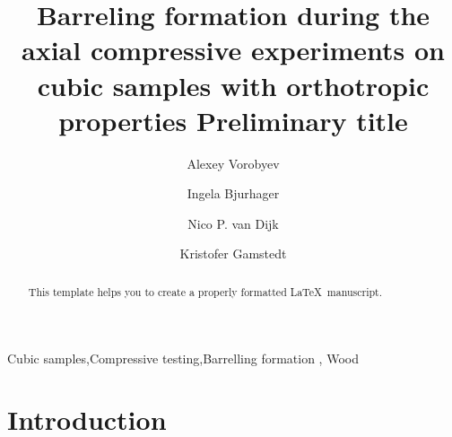 \documentclass[review]{elsarticle}
\begin{document}
\begin{frontmatter}

\title{Barreling formation during the axial compressive experiments on cubic
samples with orthotropic properties {\color{red} Preliminary title}}








\author{Alexey Vorobyev}


\author{Ingela Bjurhager}
\author{Nico P. van Dijk}
\author{Kristofer Gamstedt}

\address{Uppsala University, Division of Appplied Mechanics,
Uppsala, Sweden }



\begin{abstract}
This template helps you to create a properly formatted \LaTeX\ manuscript.
\end{abstract}

\begin{keyword}
Cubic samples\sep Compressive testing\sep Barrelling formation \sep
Wood
\end{keyword}

\end{frontmatter}

\linenumbers

\section{Introduction}
\end{document}
